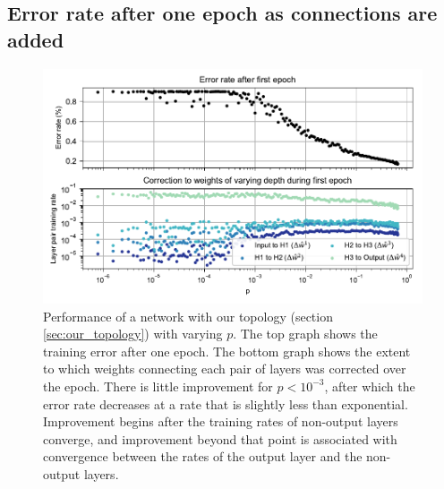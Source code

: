\documentclass[format=sigconf]{acmart}
\begin{document}
\subsection{Error rate after one epoch as connections are added}
\label{sec:mnist_1epoch}

\begin{figure}
  \centering
  \includegraphics[width=\columnwidth]{figures/MNIST_one_epoch_performance.pdf}
  \caption{Performance of a network with our topology (section \ref{sec:our_topology}) with varying $p$. The top graph shows the training error after one epoch. The bottom graph shows the extent to which weights connecting each pair of layers was corrected over the epoch. There is little improvement for $p<10^{-3}$, after which the error rate decreases at a rate that is slightly less than exponential. Improvement begins after the training rates of non-output layers converge, and improvement beyond that point is associated with convergence between the rates of the output layer and the non-output layers.}
  \label{fig:mnist_1epoch}
\end{figure}
\end{document}
